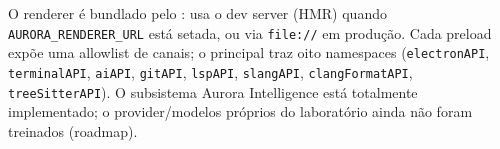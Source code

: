 O renderer é bundlado pelo :  usa o dev server (HMR) quando \lstinline|AURORA_RENDERER_URL| está setada, ou  via \lstinline|file://| em produção. Cada preload expõe uma allowlist de canais; o principal traz oito namespaces (\lstinline|electronAPI|, \lstinline|terminalAPI|, \lstinline|aiAPI|, \lstinline|gitAPI|, \lstinline|lspAPI|, \lstinline|slangAPI|, \lstinline|clangFormatAPI|, \lstinline|treeSitterAPI|). O subsistema Aurora Intelligence está totalmente implementado; o provider/modelos próprios do laboratório ainda não foram treinados (roadmap).
